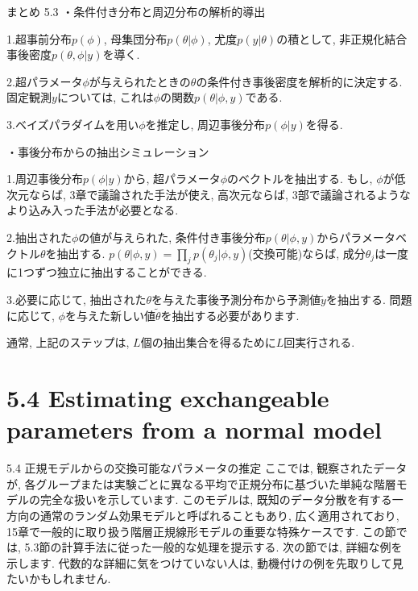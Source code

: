 \documentclass[10pt,dvipdfmx,a4]{beamer}
\begin{document}
\begin{frame}[t]{まとめ 5.3}
・条件付き分布と周辺分布の解析的導出

1.超事前分布$p(\phi)$, 母集団分布$p(\theta|\phi)$, 尤度$p(y|\theta)$の積として, 非正規化結合事後密度$p(\theta,\phi|y)$を導く.

2.超パラメータ$\phi$が与えられたときの$\theta$の条件付き事後密度を解析的に決定する.
固定観測$y$については, これは$\phi$の関数$p(\theta|\phi, y)$である.

3.ベイズパラダイムを用い$\phi$を推定し, 周辺事後分布$p(\phi|y)$を得る.

・事後分布からの抽出シミュレーション

1.周辺事後分布$p(\phi|y)$から, 超パラメータ$\phi$のベクトルを抽出する.
もし, $\phi$が低次元ならば, 3章で議論された手法が使え, 高次元ならば, 3部で議論されるようなより込み入った手法が必要となる.

2.抽出された$\phi$の値が与えられた, 条件付き事後分布$p(\theta|\phi,y)$からパラメータベクトル$\theta$を抽出する.
$p(\theta|\phi, y)=\prod_j p(\theta_j|\phi,y)$(交換可能)ならば, 成分$\theta_j$は一度に1つずつ独立に抽出することができる.

3.必要に応じて, 抽出された$\theta$を与えた事後予測分布から予測値$\tilde{y}$を抽出する.
問題に応じて, $\phi$を与えた新しい値$\tilde{\theta}$を抽出する必要があります.

通常, 上記のステップは, $L$個の抽出集合を得るために$L$回実行される.
\end{frame}

\section{5.4 Estimating exchangeable parameters from a normal model}
\begin{frame}{5.4 正規モデルからの交換可能なパラメータの推定}
ここでは, 観察されたデータが, 各グループまたは実験ごとに異なる平均で正規分布に基づいた単純な階層モデルの完全な扱いを示しています.
このモデルは, 既知のデータ分散を有する一方向の通常のランダム効果モデルと呼ばれることもあり, 広く適用されており, 15章で一般的に取り扱う階層正規線形モデルの重要な特殊ケースです.
この節では, 5.3節の計算手法に従った一般的な処理を提示する.
次の節では, 詳細な例を示します.
代数的な詳細に気をつけていない人は, 動機付けの例を先取りして見たいかもしれません.
\end{frame}

\end{document}
